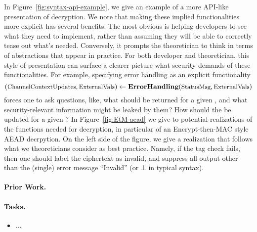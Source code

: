 In Figure~\ref{fig:syntax-api-example}, we give an example of a more
API-like presentation of decryption. 
%
We note that making these implied functionalities more explicit has
several benefits.  The most obvious is helping developers to see
what they need to implement, rather than assuming they will be able to
correctly tease out what's needed.  Conversely, it prompts the
theoretician to think in terms of abstractions that appear in
practice.  
%
For both developer and theoretician, this style of presentation can 
surface a clearer picture what security demands of these
functionalities.  For example, specifying error handling as an
explicit functionality
\[
(\varfont{ChannelContextUpdates}, \varfont{ExternalVals}) \gets
                                  \algfont{ErrorHandling}(%
                                  \varfont{StatusMsg}, \varfont{ExternalVals})
\]
forces one to ask questions, like, what  should
be returned for a given , and what
security-relevant information might be leaked by them?  How should the
 be updated for a given ?
In Figure~\ref{fig:EtM-aead} we give to potential realizations of the
functions needed for decryption, in particular of an Encrypt-then-MAC
style AEAD decrpytion.  On the left side of the figure, we
give a realization that follows what we theoreticians consider as best
practice.  Namely, if the tag check fails, then one should label the
ciphertext as invalid, and suppress all output other than the (single)
error message ``Invalid'' (or $\bot$ in typical syntax).







\paragraph{Prior Work.} 


\paragraph{Tasks.}
\begin{itemize}
\item ...
\end{itemize}
